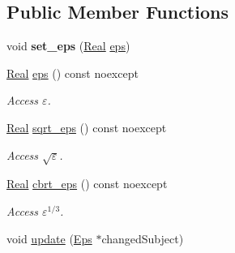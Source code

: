 \subsection*{\-Public \-Member \-Functions}
\begin{DoxyCompactItemize}
\item 
\hypertarget{classSpacy_1_1Mixin_1_1Eps_a818ab6dfab5e4eea583e1302bcc621f8}{void {\bfseries set\-\_\-eps} (\hyperlink{classSpacy_1_1Real}{\-Real} \hyperlink{classSpacy_1_1Mixin_1_1Eps_a812b99b0abc1d78a34b4114907f23f52}{eps})}\label{classSpacy_1_1Mixin_1_1Eps_a818ab6dfab5e4eea583e1302bcc621f8}

\item 
\hypertarget{classSpacy_1_1Mixin_1_1Eps_a812b99b0abc1d78a34b4114907f23f52}{\hyperlink{classSpacy_1_1Real}{\-Real} \hyperlink{classSpacy_1_1Mixin_1_1Eps_a812b99b0abc1d78a34b4114907f23f52}{eps} () const noexcept}\label{classSpacy_1_1Mixin_1_1Eps_a812b99b0abc1d78a34b4114907f23f52}

\begin{DoxyCompactList}\small\item\em \-Access $\varepsilon$. \end{DoxyCompactList}\item 
\hypertarget{classSpacy_1_1Mixin_1_1Eps_a1c1b0ed7f14ed4967dc7da9295a136d4}{\hyperlink{classSpacy_1_1Real}{\-Real} \hyperlink{classSpacy_1_1Mixin_1_1Eps_a1c1b0ed7f14ed4967dc7da9295a136d4}{sqrt\-\_\-eps} () const noexcept}\label{classSpacy_1_1Mixin_1_1Eps_a1c1b0ed7f14ed4967dc7da9295a136d4}

\begin{DoxyCompactList}\small\item\em \-Access $\sqrt\varepsilon$. \end{DoxyCompactList}\item 
\hypertarget{classSpacy_1_1Mixin_1_1Eps_a91dbe45e297be2bc53f1a96107a58c64}{\hyperlink{classSpacy_1_1Real}{\-Real} \hyperlink{classSpacy_1_1Mixin_1_1Eps_a91dbe45e297be2bc53f1a96107a58c64}{cbrt\-\_\-eps} () const noexcept}\label{classSpacy_1_1Mixin_1_1Eps_a91dbe45e297be2bc53f1a96107a58c64}

\begin{DoxyCompactList}\small\item\em \-Access $\varepsilon^{1/3}$. \end{DoxyCompactList}\item 
\hypertarget{classSpacy_1_1Mixin_1_1Eps_a151216968daef3da5f5cdc0b957ce01b}{void \hyperlink{classSpacy_1_1Mixin_1_1Eps_a151216968daef3da5f5cdc0b957ce01b}{update} (\hyperlink{classSpacy_1_1Mixin_1_1Eps_af616ae8e55a645cefd4d2d4504d6705a}{\-Eps} $\ast$changed\-Subject)}\label{classSpacy_1_1Mixin_1_1Eps_a151216968daef3da5f5cdc0b957ce01b}


\end{DoxyCompactItemize}
